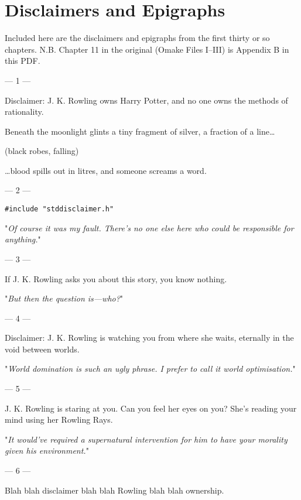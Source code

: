 \chapter{Disclaimers and Epigraphs}

Included here are the disclaimers and epigraphs from the first thirty or so chapters. N.B. Chapter 11 in the original (Omake Files I–III) is Appendix B in this PDF.

{ %
\setlength{\parindent}{0pt}
\setlength{\parskip}{1em}

\filbreak
--- 1 ---

Disclaimer: J. K. Rowling owns Harry Potter, and no one owns the methods of rationality.

\begin{em}
Beneath the moonlight glints a tiny fragment of silver, a fraction of a line{\ldots}

(black robes, falling)

{\ldots}blood spills out in litres, and someone screams a word.
\end{em}

\filbreak
--- 2 ---

\texttt{\#include "stddisclaimer.h"}

"\emph{Of course it was my fault. There’s no one else here who could be responsible for anything.}"

\filbreak
--- 3 ---

If J. K. Rowling asks you about this story, you know nothing.

"\emph{But then the question is---who?}"

\filbreak
--- 4 ---

Disclaimer: J. K. Rowling is watching you from where she waits, eternally in the void between worlds.

"\emph{World domination is such an ugly phrase. I prefer to call it world optimisation.}"

\filbreak
--- 5 ---

J. K. Rowling is staring at you. Can you feel her eyes on you? She’s reading your mind using her Rowling Rays.

"\emph{It would’ve required a \emph{supernatural intervention} for him to have \emph{your} morality given \emph{his} environment.}"

\filbreak
--- 6 ---

Blah blah disclaimer blah blah Rowling blah blah ownership.

}
